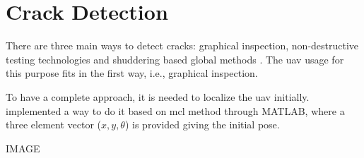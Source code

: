 \section{Crack Detection}

There are three main ways to detect cracks: graphical inspection, non-destructive testing technologies and shuddering based global methods \citep{addagatlamodern}. The \gls*{uav} usage for this purpose fits in the first way, i.e., graphical inspection.

To have a complete approach, it is needed to localize the \gls*{uav} initially. \citet{sushant2017localization} implemented a way to do it based on \gls*{mcl} method through MATLAB, where a three element vector (\(x,y,\theta\)) is provided giving the initial pose.

IMAGE

